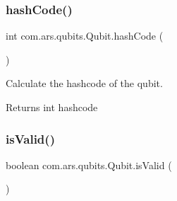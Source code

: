 \subsubsection{\texorpdfstring{hash\+Code()}{hashCode()}}
{\footnotesize\ttfamily int com.\+ars.\+qubits.\+Qubit.\+hash\+Code (\begin{DoxyParamCaption}{ }\end{DoxyParamCaption})}

Calculate the hashcode of the qubit. \begin{DoxyReturn}{Returns}
int hashcode 
\end{DoxyReturn}
\hypertarget{classcom_1_1ars_1_1qubits_1_1_qubit_acd0c96f4ba85205af1647a7f0e2c404a}{}\label{classcom_1_1ars_1_1qubits_1_1_qubit_acd0c96f4ba85205af1647a7f0e2c404a} 
\subsubsection{\texorpdfstring{is\+Valid()}{isValid()}}
{\footnotesize\ttfamily boolean com.\+ars.\+qubits.\+Qubit.\+is\+Valid (\begin{DoxyParamCaption}{ }\end{DoxyParamCaption})}

